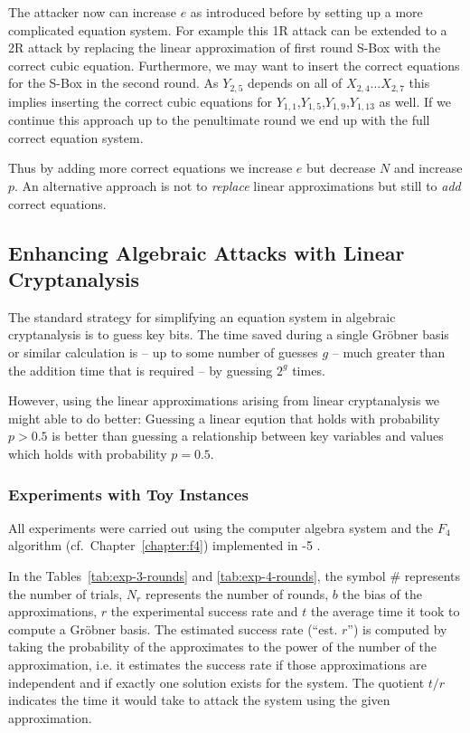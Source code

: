 The attacker now can increase $e$ as introduced before by setting up a more complicated equation system. For example
this 1R attack can be extended to a 2R attack by replacing the linear approximation of
first round S-Box with the correct cubic equation. Furthermore, we may want to insert the correct equations
for the S-Box in the second round. As $Y_{2,5}$ depends on all of $X_{2,4} \dots X_{2,7}$ this implies inserting
the correct cubic equations for $Y_{1,1}$,$Y_{1,5}$,$Y_{1,9}$,$Y_{1,13}$ as well. If we continue this
approach up to the penultimate round we end up with the full correct equation system.

Thus by adding more correct equations we increase $e$ but decrease $N$ and increase $p$. An alternative approach is not
to \emph{replace} linear approximations but still to \emph{add} correct equations.

\subsection{Enhancing Algebraic Attacks with Linear Cryptanalysis}

The standard strategy for simplifying an equation system in algebraic cryptanalysis is to guess key bits. The time saved during a single Gröbner basis or similar 
calculation is -- up to some number of guesses $g$ -- much greater than the addition time that is required -- by guessing $2^{g}$ times.

However, using the linear approximations arising from linear cryptanalysis we might able to do better: Guessing a linear eqution that holds with probability $p > 0.5$ is better than guessing a relationship between key variables and values which holds with probability $p = 0.5$.

\subsubsection{Experiments with Toy Instances}
\label{sec:experiments}
All experiments were carried out using the computer algebra system  \cite{sage} and the $F_4$ algorithm (cf.~Chapter~\ref{chapter:f4}) implemented in -5 \cite{magma}.

In the Tables~\ref{tab:exp-3-rounds} and \ref{tab:exp-4-rounds}, the symbol $\#$ represents the number of trials, $N_r$ represents the number of rounds, $b$ the bias of the approximations, $r$ the experimental success rate and $t$ the average time it took to compute a Gröbner basis. The estimated success rate (``est. $r$'') is computed by taking the probability of the approximates to the power of the number of the approximation, i.e. it estimates the success rate if those approximations are independent and if exactly one solution exists for the system. The quotient $t/r$ indicates the time it would take to attack the system using the given approximation.

